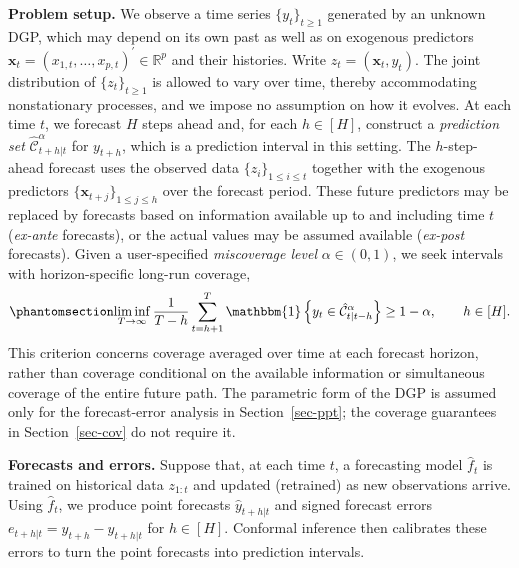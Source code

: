 \documentclass[
  american,
  12pt]{article}
\theoremstyle{plain}
\theoremstyle{plain}
\theoremstyle{remark}
\begin{document}
\textbf{Problem setup.} We observe a time series \(\{y_t\}_{t\geq1}\)
generated by an unknown DGP, which may depend on its own past as well as
on exogenous predictors
\(\bm{x}_t=(x_{1,t},\dots,x_{p,t})^{\prime}\in\mathbb{R}^p\) and their
histories. Write \(z_t=(\bm{x}_t,y_t)\). The joint distribution of
\(\{z_t\}_{t\geq1}\) is allowed to vary over time, thereby accommodating
nonstationary processes, and we impose no assumption on how it evolves.
At each time \(t\), we forecast \(H\) steps ahead and, for each
\(h\in[H]\), construct a \emph{prediction set}
\(\hat{\mathcal{C}}^{\alpha}_{t+h|t}\) for \(y_{t+h}\), which is a
prediction interval in this setting. The \(h\)-step-ahead forecast uses
the observed data \(\{z_i\}_{1\leq i\leq t}\) together with the
exogenous predictors \(\{\bm{x}_{t+j}\}_{1\leq j\leq h}\) over the
forecast period. These future predictors may be replaced by forecasts
based on information available up to and including time \(t\)
(\emph{ex-ante} forecasts), or the actual values may be assumed
available (\emph{ex-post} forecasts). Given a user-specified
\emph{miscoverage level} \(\alpha\in(0,1)\), we seek intervals with
horizon-specific long-run coverage,
\begin{equation}\phantomsection\label{eq-longrun}{
\liminf_{T\to\infty}\frac{1}{T-h}\sum_{t=h+1}^{T}\mathbbm{1}\left\{y_t\in\hat{\mathcal{C}}^{\alpha}_{t|t-h}\right\}\geq 1-\alpha,\qquad h\in[H].
}\end{equation} This criterion concerns coverage averaged over time at
each forecast horizon, rather than coverage conditional on the available
information or simultaneous coverage of the entire future path. The
parametric form of the DGP is assumed only for the forecast-error
analysis in Section~\ref{sec-ppt}; the coverage guarantees in
Section~\ref{sec-cov} do not require it.

\textbf{Forecasts and errors.} Suppose that, at each time \(t\), a
forecasting model \(\hat{f}_t\) is trained on historical data
\(z_{1:t}\) and updated (retrained) as new observations arrive. Using
\(\hat{f}_t\), we produce point forecasts \(\hat{y}_{t+h|t}\) and signed
forecast errors \(e_{t+h|t}=y_{t+h}-\hat{y}_{t+h|t}\) for \(h\in[H]\).
Conformal inference then calibrates these errors to turn the point
forecasts into prediction intervals.
\end{document}
